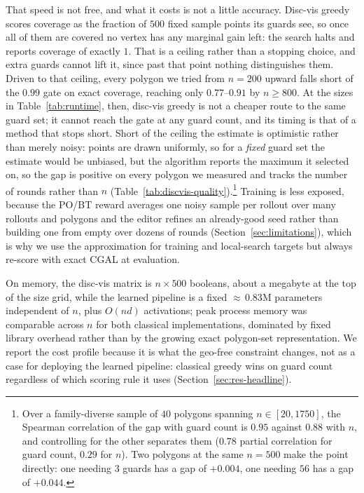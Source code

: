 \documentclass[11pt]{article}
\begin{document}
That speed is not free, and what it costs is not a little accuracy. Disc-vis greedy scores coverage as the fraction of $500$ fixed sample points its guards see, so once all of them are covered no vertex has any marginal gain left: the search halts and reports coverage of exactly $1$. That is a ceiling rather than a stopping choice, and extra guards cannot lift it, since past that point nothing distinguishes them. Driven to that ceiling, every polygon we tried from $n = 200$ upward falls short of the $0.99$ gate on exact coverage, reaching only $0.77$--$0.91$ by $n \geq 800$. At the sizes in Table~\ref{tab:runtime}, then, disc-vis greedy is not a cheaper route to the same guard set; it cannot reach the gate at any guard count, and its timing is that of a method that stops short. Short of the ceiling the estimate is optimistic rather than merely noisy: points are drawn uniformly, so for a \emph{fixed} guard set the estimate would be unbiased, but the algorithm reports the maximum it selected on, so the gap is positive on every polygon we measured and tracks the number of rounds rather than $n$ (Table~\ref{tab:discvis-quality}).\footnote{Over a family-diverse sample of $40$ polygons spanning $n \in [20, 1750]$, the Spearman correlation of the gap with guard count is $0.95$ against $0.88$ with $n$, and controlling for the other separates them ($0.78$ partial correlation for guard count, $0.29$ for $n$). Two polygons at the same $n=500$ make the point directly: one needing $3$ guards has a gap of $+0.004$, one needing $56$ has a gap of $+0.044$.} Training is less exposed, because the PO/BT reward averages one noisy sample per rollout over many rollouts and polygons and the editor refines an already-good seed rather than building one from empty over dozens of rounds (Section~\ref{sec:limitations}), which is why we use the approximation for training and local-search targets but always re-score with exact CGAL at evaluation.

On memory, the disc-vis matrix is $n \times 500$ booleans, about a megabyte at the top of the size grid, while the learned pipeline is a fixed ${\approx}\,0.83$M parameters independent of $n$, plus $O(nd)$ activations; peak process memory was comparable across $n$ for both classical implementations, dominated by fixed library overhead rather than by the growing exact polygon-set representation. We report the cost profile because it is what the geo-free constraint changes, not as a case for deploying the learned pipeline: classical greedy wins on guard count regardless of which scoring rule it uses (Section~\ref{sec:res-headline}).
\end{document}
